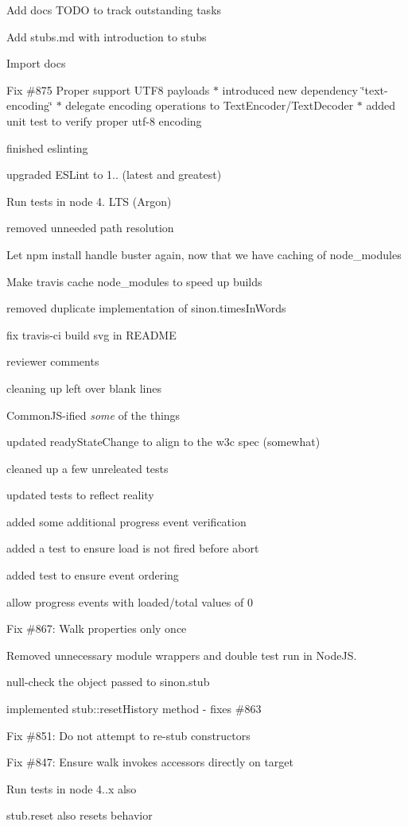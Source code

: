 \begin{DoxyItemize}
\item Add docs T\+O\+DO to track outstanding tasks
\item Add stubs.\+md with introduction to stubs
\item Import docs
\item Fix \#875 Proper support U\+T\+F8 payloads $\ast$ introduced new dependency \char`\"{}text-\/encoding\char`\"{} $\ast$ delegate encoding operations to Text\+Encoder/\+Text\+Decoder $\ast$ added unit test to verify proper utf-\/8 encoding
\item finished eslint\textquotesingle{}ing
\item upgraded E\+S\+Lint to 1.. (latest and greatest)
\item Run tests in node 4. L\+TS (Argon)
\item removed unneeded path resolution
\item Let npm install handle buster again, now that we have caching of node\+\_\+modules
\item Make travis cache node\+\_\+modules to speed up builds
\item removed duplicate implementation of sinon.\+times\+In\+Words
\item fix travis-\/ci build svg in R\+E\+A\+D\+ME
\item reviewer comments
\item cleaning up left over blank lines
\item Common\+J\+S-\/ified {\itshape some} of the things
\item updated ready\+State\+Change to align to the w3c spec (somewhat)
\item cleaned up a few unreleated tests
\item updated tests to reflect reality
\item added some additional progress event verification
\item added a test to ensure load is not fired before abort
\item added test to ensure event ordering
\item allow progress events with loaded/total values of 0
\item Fix \#867\+: Walk properties only once
\item Removed unnecessary module wrappers and double test run in Node\+JS.
\item null-\/check the object passed to sinon.\+stub
\item implemented stub\+::reset\+History method -\/ fixes \#863
\item Fix \#851\+: Do not attempt to re-\/stub constructors
\item Fix \#847\+: Ensure walk invokes accessors directly on target
\item Run tests in node 4..\+x also
\item stub.\+reset also resets behavior
\end{DoxyItemize}

